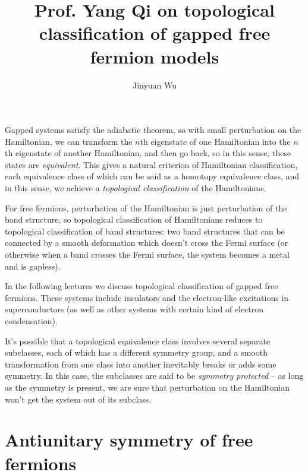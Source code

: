 \documentclass[hyperref, a4paper]{article}
\title{Prof. Yang Qi on topological classification of gapped free fermion models}
\author{Jinyuan Wu}
\begin{document}
\maketitle

Gapped systems satisfy 
the adiabatic theorem, so with small perturbation on the Hamiltonian, we can transform the $n$th eigenstate 
of one Hamiltonian into the $n$th eigenstate of another Hamiltonian, and then go back, so in this sense, 
these states are \emph{equivalent}. This gives a natural criterion of Hamiltonian classification, each 
equivalence class of which can be said as a homotopy equivalence class, and in this sense, 
we achieve a \emph{topological classification} of the Hamiltonians.

For free fermions, perturbation of the Hamiltonian is just perturbation of the band structure, so 
topological classification of Hamiltonians reduces to topological classification of band structures:
two band structures that can be connected by a smooth deformation which doesn't cross the Fermi surface
(or otherwise when a band crosses the Fermi surface, the system becomes a metal and is gapless). 

In the following lectures we discuss topological classification of gapped free fermions.
These systems include insulators and the electron-like excitations in superconductors (as well as other 
systems with certain kind of electron condensation).

It's possible that a topological equivalence class involves several separate subclasses, each of which 
has a different symmetry group, and a smooth transformation from one class into another inevitably 
breaks or adds some symmetry. In this case, the subclasses are said to be \emph{symmetry protected} --
as long as the symmetry is present, we are sure that perturbation on the Hamiltonian won't get 
the system out of its subclass.

\section{Antiunitary symmetry of free fermions}
\end{document}
